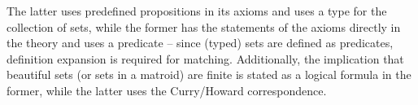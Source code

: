
The latter uses predefined propositions in its axioms and uses a type  for the collection of sets, while the former has the statements of the axioms directly in the theory and uses a predicate  -- since (typed) sets are defined as predicates, definition expansion is required for matching.
Additionally, the implication that beautiful sets (or sets in a matroid) are finite is stated as a logical formula in the former, while the latter uses the Curry/Howard correspondence.


